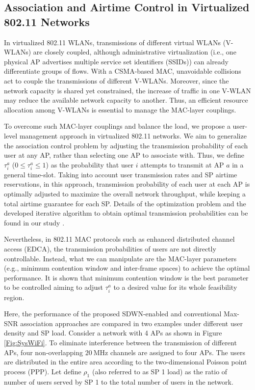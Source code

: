 \documentclass[conference]{IEEEtran}
\begin{document}
\subsection{Association and Airtime Control in Virtualized 802.11 Networks}
In virtualized 802.11 WLANs, transmissions of different virtual WLANs (V-WLANs) are closely coupled, although administrative virtualization (i.e., one physical AP advertises multiple service set identifiers (SSIDs)) can already differentiate groups of flows. With a CSMA-based MAC, unavoidable collisions act to couple the transmissions of different V-WLANs. Moreover, since the network capacity is shared yet constrained, the increase of traffic in one V-WLAN may reduce the available network capacity to another. Thus, an efficient resource allocation among V-WLANs is essential to manage the MAC-layer couplings.

To overcome such MAC-layer couplings and balance the load, we propose a user-level management approach in virtualized 802.11 networks. We aim to generalize the association control problem by adjusting the transmission probability of each user at any AP, rather than selecting one AP to associate with. Thus, we define $\tau_i^a$ ($0\leq \tau_i^a\leq 1$) as the probability that user $i$ attempts to transmit at AP $a$ in a general time-slot. Taking into account user transmission rates and SP airtime reservations, in this approach, transmission probability of each user at each AP is optimally adjusted to maximize the overall network throughput, while keeping a total airtime guarantee for each SP. Details of the optimization problem and the developed iterative algorithm to obtain optimal transmission probabilities can be found in our study \cite{Derakhshani2014}.

Nevertheless, in 802.11 MAC protocols such as enhanced distributed channel access (EDCA), the transmission probabilities of users are not directly controllable. Instead, what we can manipulate are the MAC-layer parameters (e.g., minimum contention window and inter-frame spaces) to achieve the optimal performance. It is shown that minimum contention window is the best parameter to be controlled aiming to adjust $\tau_i^a$ to a desired value for its whole feasibility region.

Here, the performance of the proposed SDWN-enabled and conventional Max-SNR association approaches are compared in two examples under different user density and SP load. Consider a network with 4 APs as shown in Figure \ref{Fig:SysWiFi}. To eliminate interference between the transmission of different APs, four non-overlapping $20~\text{MHz}$ channels are assigned to four APs. The users are distributed in the entire area according to the two-dimensional Poisson point process (PPP). Let define $\rho_1$ (also referred to as SP 1 load) as the ratio of number of users served by SP 1 to the total number of users in the network.
\end{document}
